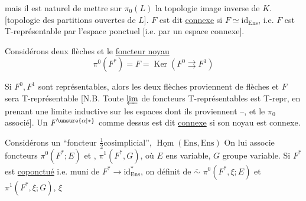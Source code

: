 mais il est naturel de mettre sur $\pi_0(L)$ la topologie image inverse de $K$. [topologie  des partitions ouvertes de $L$]. $F$ est dit \uline{connexe} si $F\simeq\mathrm{id}_{\mathrm{Ens}}$, i.e. $F$ est T-représentable par l'espace ponctuel [i.e. par un espace connexe].

Considérons deux  flèches
et le \uline{foncteur noyau}
\[
\pi^0(F^*)=F=\operatorname{Ker}(F^0\rightrightarrows F^1)
\]

Si $F^0,F^1$ sont représentables, alors les deux flèches proviennent de flèches
et $F$ sera  T-représentable [N.B. Toute $\varprojlim$ de foncteurs T-représentables est T-repr, en prenant une limite inductive sur les espaces dont ils proviennent --,  et le $\pi_0$ associé]. Un  $F^{\unsure{\alpha|*}}$ comme dessus est dit \uline{connexe} si son noyau est connexe.

Considérons un ``foncteur $\frac12$cosimplicial'',   $\underline{\operatorname{Hom}}(\mathrm{Ens},\mathrm{Ens})$
On lui associe foncteurs $\pi^0(F^*;E)$ et , $\pi^1(F^*,G)$, où $E$ ens variable, $G$ groupe variable. Si $F^*$ est \uline{coponctué} i.e. muni de $F^*\to\mathrm{id}_{\mathrm{Ens}}^*$, on définit de $\overline{\sim}$ $\pi^0(F^*,\xi;E)$ et $\pi^1(F^*,\xi;G)$, $\xi$

